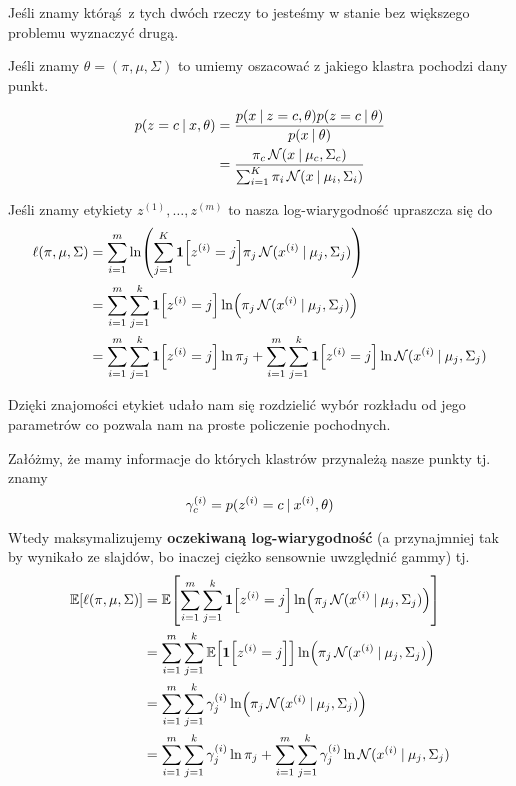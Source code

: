 Jeśli znamy którąś z tych dwóch rzeczy to jesteśmy w stanie bez większego problemu wyznaczyć drugą.

Jeśli znamy \( \theta = (\pi, \mu, \Sigma) \) to umiemy oszacować z jakiego klastra pochodzi dany punkt.

\begin{align*}
    p(z = c \:\vert\: x, \theta)
        &= \frac{p(x \:\vert\: z = c, \theta)p(z = c \:\vert\: \theta)}{p(x \:\vert\: \theta)} \\
        &= \frac{\pi_c\operatorname{\mathcal{N}}(x \:\vert\: \mu_c, \Sigma_c)}{
        \sum_{i=1}^K \pi_i \operatorname{\mathcal{N}}(x \:\vert\: \mu_i, \Sigma_i)
        }
\end{align*}

Jeśli znamy etykiety \( z^{(1)}, \dots, z^{(m)} \) to nasza log-wiarygodność upraszcza się do
\begin{align*}
    \ell(\pi, \mu, \Sigma)
        &= \sum_{i=1}^m \ln \pars{\sum_{j=1}^K \indicator{z^{(i)} = j} 
        \pi_j\Normal(x^{(i)} \given \mu_j, \Sigma_j)
        } \\
        &= \sum_{i=1}^m \sum_{j=1}^k \indicator{z^{(i)} = j} \ln\pars{\pi_j\Normal(x^{(i)} \given \mu_j, \Sigma_j)} \\
        &= \sum_{i=1}^m \sum_{j=1}^k \indicator{z^{(i)} = j} \ln \pi_j
        +
        \sum_{i=1}^m \sum_{j=1}^k \indicator{z^{(i)} = j}
        \ln \Normal(x^{(i)} \given \mu_j, \Sigma_j)
\end{align*}

Dzięki znajomości etykiet udało nam się rozdzielić wybór rozkładu od jego parametrów co pozwala nam na proste policzenie pochodnych.


Załóżmy, że mamy informacje do których klastrów przynależą nasze punkty tj. znamy
\[
    \gamma^{(i)}_c = p(z^{(i)} = c \:\vert\: x^{(i)}, \theta)
\]

Wtedy maksymalizujemy \textbf{oczekiwaną log-wiarygodność} (a przynajmniej tak by wynikało ze slajdów, bo inaczej ciężko sensownie uwzględnić gammy) tj.
\begin{align*}
    \expected{\ell(\pi, \mu, \Sigma)}
        &= \expected{\sum_{i=1}^m \sum_{j=1}^k \indicator{z^{(i)} = j} \ln\pars{\pi_j\Normal(x^{(i)} \given \mu_j, \Sigma_j)}} \\
        &= \sum_{i=1}^m \sum_{j=1}^k \expected{\indicator{z^{(i)} = j}} \ln\pars{\pi_j\Normal(x^{(i)} \given \mu_j, \Sigma_j)} \\
        &= \sum_{i=1}^m \sum_{j=1}^k \gamma^{(i)}_j \ln\pars{\pi_j\Normal(x^{(i)} \given \mu_j, \Sigma_j)} \\
        &= \sum_{i=1}^m \sum_{j=1}^k \gamma^{(i)}_j \ln \pi_j
        +
        \sum_{i=1}^m \sum_{j=1}^k \gamma^{(i)}_j
        \ln \Normal(x^{(i)} \given \mu_j, \Sigma_j)
\end{align*}

